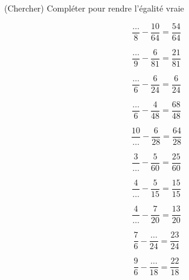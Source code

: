  (Chercher) Compléter pour rendre l'égalité vraie

\begin{multicols}{5}
$$\dfrac{\dots}{8}-\dfrac{ 10}{64}=\dfrac{54}{64}$$

$$\dfrac{\dots}{9}-\dfrac{ 6}{81}=\dfrac{21}{81}$$

$$\dfrac{\dots}{6}-\dfrac{ 6}{24}=\dfrac{6}{24}$$

$$\dfrac{\dots}{6}-\dfrac{ 4}{48}=\dfrac{68}{48}$$

$$\dfrac{10}{\dots}-\dfrac{ 6}{28}=\dfrac{64}{28}$$

$$\dfrac{3}{\dots}-\dfrac{ 5}{60}=\dfrac{25}{60}$$

$$\dfrac{4}{\dots}-\dfrac{ 5}{15}=\dfrac{15}{15}$$

$$\dfrac{4}{\dots}-\dfrac{ 7}{20}=\dfrac{13}{20}$$

$$\dfrac{7}{6}-\dfrac{ \dots}{24}=\dfrac{23}{24}$$

$$\dfrac{9}{6}-\dfrac{ \dots}{18}=\dfrac{22}{18}$$

\end{multicols}